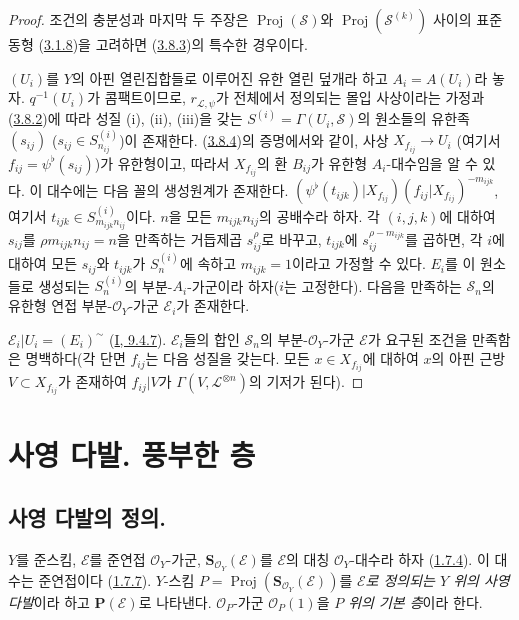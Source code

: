 \begin{proof}
조건의 충분성과 마지막 두 주장은
$\operatorname{Proj}(\mathcal{S})$와
$\operatorname{Proj}(\mathcal{S}^{(k)})$ 사이의 표준 동형
(\hyperref[II.3.1.8-ko]{3.1.8})을 고려하면
(\hyperref[II.3.8.3-ko]{3.8.3})의 특수한 경우이다.

$(U_i)$를 $Y$의 아핀 열린집합들로 이루어진 유한 열린 덮개라 하고
$A_i=A(U_i)$라 놓자. $q^{-1}(U_i)$가 콤팩트이므로,
$r_{\mathcal{L},\psi}$가 전체에서 정의되는 몰입 사상이라는 가정과
(\hyperref[II.3.8.2-ko]{3.8.2})에 따라 성질 (i), (ii), (iii)을 갖는
$S^{(i)}=\Gamma(U_i,\mathcal{S})$의 원소들의 유한족 $(s_{ij})$
($s_{ij}\in S_{n_{ij}}^{(i)}$)이 존재한다.
(\hyperref[II.3.8.4-ko]{3.8.4})의 증명에서와 같이, 사상
$X_{f_{ij}}\to U_i$ (여기서 $f_{ij}=\psi^\flat(s_{ij})$)가 유한형이고,
따라서 $X_{f_{ij}}$의 환 $B_{ij}$가 유한형 $A_i$-대수임을 알 수 있다.
이 대수에는 다음 꼴의 생성원계가 존재한다.
$(\psi^\flat(t_{ijk})|X_{f_{ij}})(f_{ij}|X_{f_{ij}})^{-m_{ijk}}$,
여기서 $t_{ijk}\in S_{m_{ijk}n_{ij}}^{(i)}$이다. $n$을 모든
$m_{ijk}n_{ij}$의 공배수라 하자. 각 $(i,j,k)$에 대하여 $s_{ij}$를
$\rho m_{ijk}n_{ij}=n$을 만족하는 거듭제곱 $s_{ij}^\rho$로 바꾸고,
$t_{ijk}$에 $s_{ij}^{\rho-m_{ijk}}$를 곱하면, 각 $i$에 대하여 모든
$s_{ij}$와 $t_{ijk}$가 $S_n^{(i)}$에 속하고 $m_{ijk}=1$이라고 가정할
수 있다. $E_i$를 이 원소들로 생성되는 $S_n^{(i)}$의 부분-$A_i$-가군이라
하자($i$는 고정한다). 다음을 만족하는 $\mathcal{S}_n$의 유한형 연접
부분-$\mathcal{O}_Y$-가군 $\mathcal{E}_i$가 존재한다.


$\mathcal{E}_i|U_i=(E_i)^{\sim}$
(\hyperref[I.9.4.7-ko]{I, 9.4.7}). $\mathcal{E}_i$들의 합인
$\mathcal{S}_n$의 부분-$\mathcal{O}_Y$-가군 $\mathcal{E}$가 요구된
조건을 만족함은 명백하다(각 단면 $f_{ij}$는 다음 성질을 갖는다. 모든
$x\in X_{f_{ij}}$에 대하여 $x$의 아핀 근방
$V\subset X_{f_{ij}}$가 존재하여 $f_{ij}|V$가
$\Gamma(V,\mathcal{L}^{\otimes n})$의 기저가 된다).
\end{proof}

\section{사영 다발. 풍부한 층}
\label{section:II.4-ko}

\subsection{사영 다발의 정의.}
\label{subsection:II.4.1-ko}

\begin{definition}[4.1.1]
\label{II.4.1.1-ko}
$Y$를 준스킴, $\mathcal{E}$를 준연접 $\mathcal{O}_Y$-가군,
$\mathbf{S}_{\mathcal{O}_Y}(\mathcal{E})$를 $\mathcal{E}$의 대칭
$\mathcal{O}_Y$-대수라 하자
(\hyperref[II.1.7.4-ko]{1.7.4}). 이 대수는 준연접이다
(\hyperref[II.1.7.7-ko]{1.7.7}). $Y$-스킴
$P=\operatorname{Proj}(\mathbf{S}_{\mathcal{O}_Y}(\mathcal{E}))$를
\emph{$\mathcal{E}$로 정의되는 $Y$ 위의 사영 다발}이라 하고
$\mathbf{P}(\mathcal{E})$로 나타낸다. $\mathcal{O}_P$-가군
$\mathcal{O}_P(1)$을 \emph{$P$ 위의 기본 층}이라 한다.
\end{definition}

